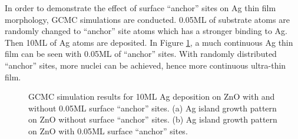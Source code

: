 In order to demonstrate the effect of surface ``anchor'' sites on Ag thin film morphology, \ac{GCMC} simulations are conducted. 0.05\ac{ML} of substrate atoms are randomly changed to ``anchor'' site atoms which has a stronger binding to Ag. Then 10\ac{ML} of Ag atoms are deposited. In Figure \ref{Chap:Ag/ZnO:fig14}, a much continuous Ag thin film can be seen with 0.05\ac{ML} of ``anchor'' sites. With randomly distributed ``anchor'' sites, more nuclei can be achieved, hence more continuous ultra-thin film.

\newpage
\begingroup
\begin{figure}[!ht]
  \centering
  \label{Chap:Ag/ZnO:fig:14a}
  \label{Chap:Ag/ZnO:fig:14b}
\caption[GCMC simulation results for 10\ac{ML} Ag deposition on ZnO with and without 0.05\ac{ML} surface ``anchor'' sites.]{\ac{GCMC} simulation results for 10\ac{ML} Ag deposition on ZnO with and without 0.05\ac{ML} surface ``anchor'' sites. (a) Ag island growth pattern on ZnO without surface ``anchor'' sites. (b) Ag island growth pattern on ZnO with 0.05\ac{ML} surface ``anchor'' sites.}
\label{Chap:Ag/ZnO:fig14}
\end{figure}
\endgroup